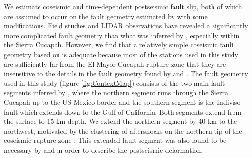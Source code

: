 \documentclass[1p]{elsarticle}
\begin{document}
We estimate coseismic and time-dependent postseismic fault slip, both of which are assumed to occur on the fault geometry estimated by \citet{Wei2011} with some modifications.  Field studies \citep{Fletcher2014} and LIDAR observations \citep{Oskin2012} have revealed a significantly more complicated fault geometry than what was inferred by \citet{Wei2011}, especially within the Sierra Cucapah.  However, we find that a relatively simple coseismic fault geometry based on \citep{Wei2011} is adequate because most of the stations used in this study are sufficiently far from the El Mayor-Cucapah rupture zone that they are insensitive to the details in the fault geometry found by \citet{Fletcher2014} and \citet{Oskin2012}.  The fault geometry used in this study (figure \ref{fig:ContextMap}) consists of the two main fault segments inferred by \citet{Wei2011}, where the northern segment runs through the Sierra Cucapah up to the US-Mexico border and the southern segment is the Indiviso fault which extends down to the Gulf of California. Both segments extend from the surface to 15 km depth.  We extend the northern segment by 40 km to the northwest, motivated by the clustering of aftershocks on the northern tip of the coseismic rupture zone \citep{Hauksson2011,Kroll2013}.  This extended fault segment was also found to be necessary by \citet{Rollins2015} and \citet{Pollitz2012} in order to describe the postseismic deformation. 
\end{document}
